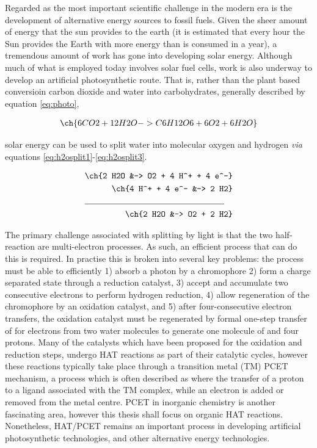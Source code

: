 Regarded as the most important scientific challenge in the modern era is the
development of alternative energy sources to fossil fuels. Given the sheer
amount of energy that the sun provides to the earth (it is estimated that every
hour the Sun provides the Earth with more energy than is consumed in a
year),\cite{Karkas2014} a tremendous amount of work has gone into developing
solar energy. Although much of what is employed today involves solar fuel cells,
work is also underway to develop an artificial photosynthetic route. That is,
rather than the plant based conversioin carbon dioxide and water into
carbohydrates, generally described by equation \ref{eq:photo},

\begin{align} 
\ch{6 CO2 + 12 H2O -> C6H12O6 + 6 O2 + 6 H2O}\label{eq:photo}
\end{align}

\noindent solar energy can be used to split water into molecular oxygen and
hydrogen \emph{via} equations \ref{eq:h2osplit1}-\ref{eq:h2osplit3}.

\begin{align} 
\ch{2 H2O &-> O2 + 4 H^+ + 4 e^-}\label{eq:h2osplit1} \\ 
\ch{4 H^+ + 4 e^- &-> 2 H2}\label{eq:h2osplit2} \\ 
\cline{1-2} 
\ch{2 H2O &-> O2 + 2 H2}\label{eq:h2osplit3}
\end{align}

The primary challenge associated with splitting  by light is that the
two half-reaction are multi-electron processes. As such, an efficient process
that can do this is required. In practise this is broken into several key
problems: the process must be able to efficiently 1) absorb a photon by a
chromophore 2) form a charge separated state through a reduction catalyst, 3)
accept and accumulate two consecutive electrons to perform hydrogen reduction,
4) allow regeneration of the chromophore by an oxidation catalyst, and 5) after
four-consecutive electron transfers, the oxidation catalyst must be regenerated
by formal one-step transfer of for electrons from two water molecules to
generate one molecule of  and four
protons.\cite{Gust2009,Concepcion2012,Karkas2014} Many of the catalysts which
have been proposed for the oxidation and reduction steps, undergo HAT reactions
as part of their catalytic cycles, however these reactions typically take place
through a transition metal (TM) PCET mechanism, a process which is often
described as where the transfer of a proton to a ligand associated with the TM
complex, while an electron is added or removed from the metal centre. PCET in
inorganic chemistry is another fascinating area, however this thesis shall focus
on organic HAT reactions. Nonetheless, HAT/PCET remains an important process in
developing artificial photosynthetic technologies, and other alternative energy
technologies.


